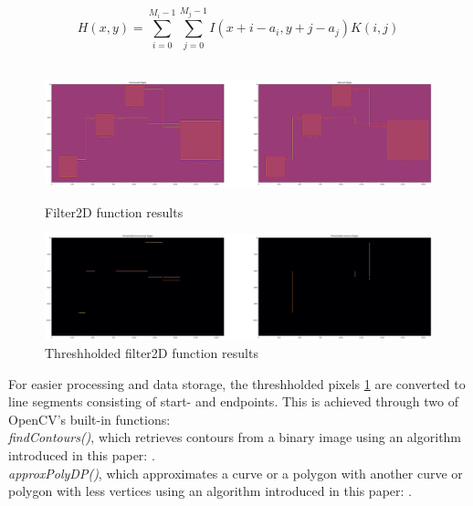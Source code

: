 \begin{equation}
\label{eq_filter2D}
    H(x, y) = \sum_{i=0}^{M_i-1} \sum_{j=0}^{M_j-1} I(x + i - a_i,y + j - a_j)K(i, j)
\end{equation}\\

\newpage

\begin{figure}[htb]
    \centering
    \includegraphics[width=1\linewidth]{Pictures/filter2D.png}
    \caption{Filter2D function results}
    \label{fig_filter2d}

    \centering
    \includegraphics[width=1\linewidth]{Pictures/threshhold.png}
    \caption{Threshholded filter2D function results}
    \label{fig_threshhold}
\end{figure}
For easier processing and data storage, the threshholded pixels \ref{fig_threshhold} are converted to line segments consisting of start- and endpoints. This is achieved through two of OpenCV's built-in functions:\\
\textit{findContours()}, which retrieves contours from a binary image using an algorithm introduced in this paper: \cite{art_findContours_algorithm}.\\
\textit{approxPolyDP()}, which approximates a curve or a polygon with another curve or polygon with less vertices using an algorithm introduced in this paper: \cite{art_approx_Poly_DP_algorithm}.

